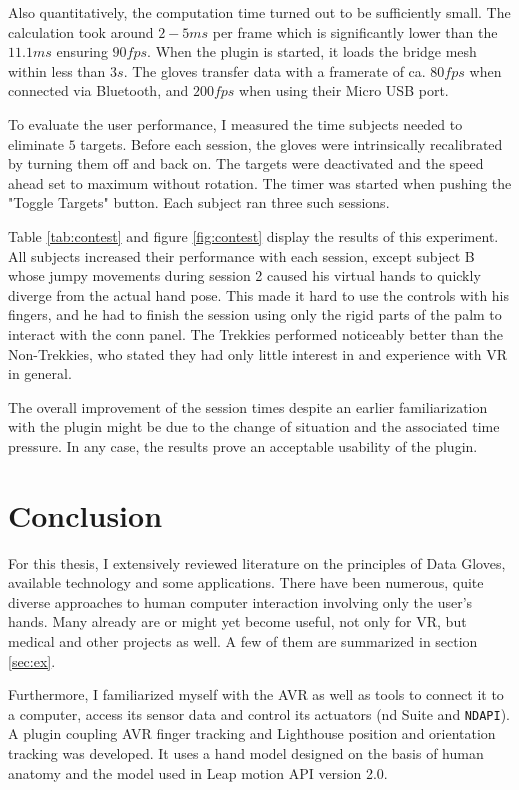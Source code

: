 \documentclass[hyperref, bachelorofscience]{cgvpub}
\begin{document}
Also quantitatively, the computation time turned out to be sufficiently small. The calculation took around $ 2-5ms $ per frame which is significantly lower than the $ 11.1ms $ ensuring $ 90fps $. When the plugin is started, it loads the bridge mesh within less than $ 3s $. The gloves transfer data with a framerate of ca. $ 80fps $ when connected via Bluetooth, and $ 200fps $ when using their Micro USB port. 

To evaluate the user performance, I measured the time subjects needed to eliminate $ 5 $ targets. Before each session, the gloves were intrinsically recalibrated by turning them off and back on. The targets were deactivated and the speed ahead set to maximum without rotation. The timer was started when pushing the "Toggle Targets" button. Each subject ran three such sessions.

Table \ref{tab:contest} and figure \ref{fig:contest} display the results of this experiment. All subjects increased their performance with each session, except subject B whose jumpy movements during session 2 caused his virtual hands to quickly diverge from the actual hand pose. This made it hard to use the controls with his fingers, and he had to finish the session using only the rigid parts of the palm to interact with the conn panel. The Trekkies performed noticeably better than the Non-Trekkies, who stated they had only little interest in and experience with VR in general. 

The overall improvement of the session times despite an earlier familiarization with the plugin might be due to the change of situation and the associated time pressure. In any case, the results prove an acceptable usability of the plugin.

\chapter{Conclusion}
For this thesis, I extensively reviewed literature on the principles of Data Gloves, available technology and some applications. There have been numerous, quite diverse approaches to human computer interaction involving only the user's hands. Many already are or might yet become useful, not only for VR, but medical and other projects as well. A few of them are summarized in section \ref{sec:ex}.

Furthermore, I familiarized myself with the \Gls{AVR} as well as tools to connect it to a computer, access its sensor data and control its actuators (\acrshort{nd} Suite and \lstinline|NDAPI|). A plugin coupling \Gls{AVR} finger tracking and Lighthouse position and orientation tracking was developed. It uses a hand model designed on the basis of human anatomy and the model used in Leap motion API version 2.0. 
\end{document}

